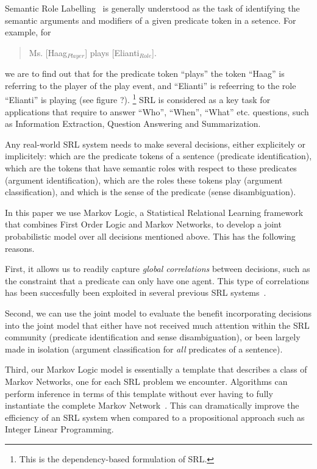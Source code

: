 
Semantic Role Labelling~\citep[SRL, ][]{carreras05introduction}
is generally understood as the task of identifying the semantic arguments
and modifiers of a given predicate token in a setence. For example,
for
\begin{quote}
Ms. {[}Haag$_{Player}$] plays {[}Elianti$_{Role}$].
\end{quote}
we are to find out that for the predicate token {}``plays'' the
token {}``Haag'' is referring to the player of the play event, and
{}``Elianti'' is refeerring to the role {}``Elianti'' is playing
(see figure ?).%
\footnote{This is the dependency-based formulation of SRL.%
} SRL is considered as a key task for applications that require to
answer {}``Who'', {}``When'', {}``What'' etc. questions, such
as Information Extraction, Question Answering and Summarization. 

Any real-world SRL system needs to make several decisions, either
explicitely or implicitely: which are the predicate tokens of a sentence
(predicate identification), which are the tokens that have semantic
roles with respect to these predicates (argument identification),
which are the roles these tokens play (argument classification), and
which is the sense of the predicate (sense disambiguation).

In this paper we use Markov Logic, a Statistical Relational Learning
framework that combines First Order Logic and Markov Networks, to
develop a joint probabilistic model over all decisions mentioned above.
This has the following reasons. %

First, it allows us to readily capture \emph{global correlations}
between decisions, such as the constraint that a predicate can only
have one agent. This type of correlations has been succesfully been
exploited in several previous SRL systems~\citep{toutanova05joint,punyakanok05generalized}. 

Second, we can use the joint model to evaluate the benefit incorporating
decisions into the joint model that either have not received much
attention within the SRL community (predicate identification and sense
disambiguation), or been largely made in isolation (argument classification
for \emph{all} predicates of a sentence). 

Third, our Markov Logic model is essentially a template that describes
a class of Markov Networks, one for each SRL problem we encounter.
Algorithms can perform inference in terms of this template without
ever having to fully instantiate the complete Markov
Network~\citep{riedel08improving}. This can dramatically improve the efficiency of an SRL system when
compared to a propositional approach such as Integer Linear Programming.

